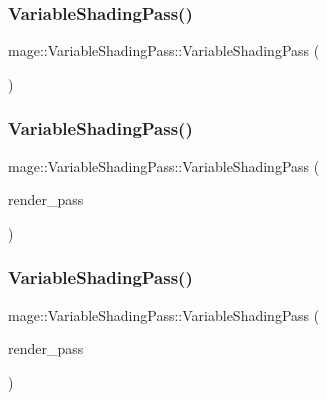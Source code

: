 \subsubsection{\texorpdfstring{Variable\+Shading\+Pass()}{VariableShadingPass()}\hspace{0.1cm}{\footnotesize\ttfamily [1/3]}}
{\footnotesize\ttfamily mage\+::\+Variable\+Shading\+Pass\+::\+Variable\+Shading\+Pass (\begin{DoxyParamCaption}{ }\end{DoxyParamCaption})}

\hypertarget{classmage_1_1_variable_shading_pass_a98ce8bacba3894ff29d2a13d3a645d22}{}\label{classmage_1_1_variable_shading_pass_a98ce8bacba3894ff29d2a13d3a645d22} 
\subsubsection{\texorpdfstring{Variable\+Shading\+Pass()}{VariableShadingPass()}\hspace{0.1cm}{\footnotesize\ttfamily [2/3]}}
{\footnotesize\ttfamily mage\+::\+Variable\+Shading\+Pass\+::\+Variable\+Shading\+Pass (\begin{DoxyParamCaption}\item[{const \hyperlink{classmage_1_1_variable_shading_pass}{Variable\+Shading\+Pass} \&}]{render\+\_\+pass }\end{DoxyParamCaption})\hspace{0.3cm}{\ttfamily [delete]}}

\hypertarget{classmage_1_1_variable_shading_pass_afcb297b4d400a6eb119846d4c04fc3d1}{}\label{classmage_1_1_variable_shading_pass_afcb297b4d400a6eb119846d4c04fc3d1} 
\subsubsection{\texorpdfstring{Variable\+Shading\+Pass()}{VariableShadingPass()}\hspace{0.1cm}{\footnotesize\ttfamily [3/3]}}
{\footnotesize\ttfamily mage\+::\+Variable\+Shading\+Pass\+::\+Variable\+Shading\+Pass (\begin{DoxyParamCaption}\item[{\hyperlink{classmage_1_1_variable_shading_pass}{Variable\+Shading\+Pass} \&\&}]{render\+\_\+pass }\end{DoxyParamCaption})\hspace{0.3cm}{\ttfamily [default]}}

